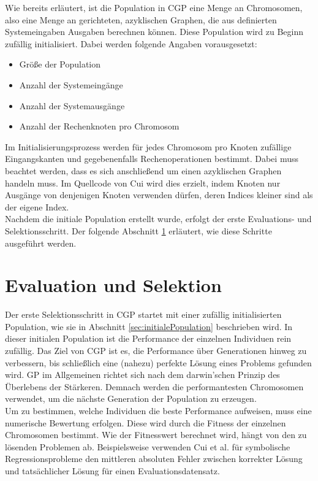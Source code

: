 Wie bereits erläutert, ist die Population in CGP eine Menge an Chromosomen, also eine Menge an gerichteten, azyklischen Graphen, die aus definierten Systemeingaben Ausgaben berechnen können.
Diese Population wird zu Beginn zufällig initialisiert.
Dabei werden folgende Angaben vorausgesetzt:
\begin{itemize}
    \item Größe der Population
    \item Anzahl der Systemeingänge
    \item Anzahl der Systemausgänge
    \item Anzahl der Rechenknoten pro Chromosom
\end{itemize}
Im Initialisierungsprozess werden für jedes Chromosom pro Knoten zufällige Eingangskanten und gegebenenfalls Rechenoperationen bestimmt.
Dabei muss beachtet werden, dass es sich anschließend um einen azyklischen Graphen handeln muss.
Im Quellcode von Cui wird dies erzielt, indem Knoten nur Ausgänge von denjenigen Knoten verwenden dürfen, deren Indices kleiner sind als der eigene Index.\\

Nachdem die initiale Population erstellt wurde, erfolgt der erste Evaluations- und Selektionsschritt. 
Der folgende Abschnitt \ref{sec:evalUndSelektion} erläutert, wie diese Schritte ausgeführt werden.


\section{Evaluation und Selektion}
\label{sec:evalUndSelektion}

Der erste Selektionsschritt in CGP startet mit einer zufällig initialisierten Population, wie sie in Abschnitt \ref{sec:initialePopulation} beschrieben wird.
In dieser initialen Population ist die Performance der einzelnen Individuen rein zufällig.
Das Ziel von CGP ist es, die Performance über Generationen hinweg zu verbessern, bis schließlich eine (nahezu) perfekte Lösung eines Problems gefunden wird.
GP im Allgemeinen richtet sich nach dem darwin'schen Prinzip des Überlebens der Stärkeren.
Demnach werden die performantesten Chromosomen verwendet, um die nächste Generation der Population zu erzeugen. \cite{koza_survey_1995}\\

Um zu bestimmen, welche Individuen die beste Performance aufweisen, muss eine numerische Bewertung erfolgen.
Diese wird durch die Fitness der einzelnen Chromosomen bestimmt. \cite{koza_survey_1995}
Wie der Fitnesswert berechnet wird, hängt von den zu lösenden Problemen ab.
Beispielsweise verwenden Cui et al. für symbolische Regressionsprobleme den mittleren absoluten Fehler zwischen korrekter Lösung und tatsächlicher Lösung für einen Evaluationsdatensatz. \cite{affenzeller_positional_2024}\\

